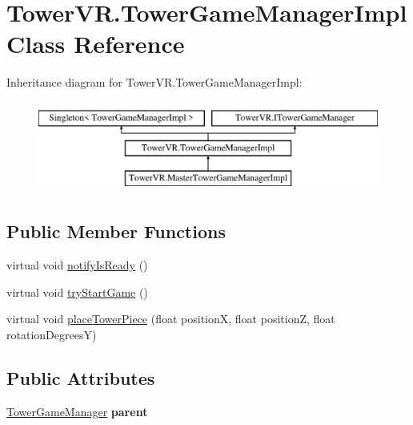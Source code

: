 \hypertarget{class_tower_v_r_1_1_tower_game_manager_impl}{}\section{Tower\+V\+R.\+Tower\+Game\+Manager\+Impl Class Reference}
\label{class_tower_v_r_1_1_tower_game_manager_impl}
Inheritance diagram for Tower\+V\+R.\+Tower\+Game\+Manager\+Impl\+:\begin{figure}[H]
\begin{center}
\leavevmode
\includegraphics[height=3.000000cm]{class_tower_v_r_1_1_tower_game_manager_impl}
\end{center}
\end{figure}
\subsection*{Public Member Functions}
\begin{DoxyCompactItemize}
\item 
virtual void \hyperlink{class_tower_v_r_1_1_tower_game_manager_impl_ad4a2f3ff8f70fc26602d0c872d5cc36c}{notify\+Is\+Ready} ()
\item 
virtual void \hyperlink{class_tower_v_r_1_1_tower_game_manager_impl_a04ad123026136abf9c009ff4c03937dc}{try\+Start\+Game} ()
\item 
virtual void \hyperlink{class_tower_v_r_1_1_tower_game_manager_impl_a47563c59b6d436c05a1f70c16aeb30e9}{place\+Tower\+Piece} (float positionX, float positionZ, float rotation\+DegreesY)
\end{DoxyCompactItemize}
\subsection*{Public Attributes}
\begin{DoxyCompactItemize}
\item 
\hyperlink{class_tower_v_r_1_1_tower_game_manager}{Tower\+Game\+Manager} {\bfseries parent}\hypertarget{class_tower_v_r_1_1_tower_game_manager_impl_a97ba625071b296f357f329db279531a0}{}\label{class_tower_v_r_1_1_tower_game_manager_impl_a97ba625071b296f357f329db279531a0}

\end{DoxyCompactItemize}
